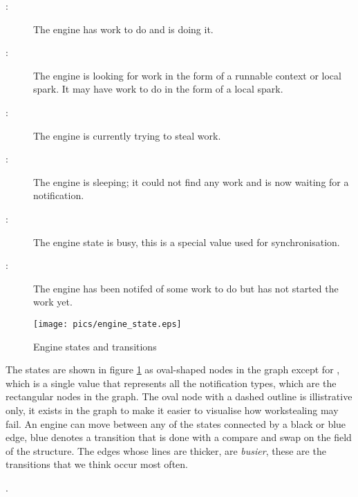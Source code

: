 \begin{description}
    \item[:] The engine has work to do and is doing it.

    \item[:] The engine is looking for work in
        the form of a runnable context or local spark.  It may have work to
        do in the form of a local spark.

    \item[:] The engine is currently trying to steal work.

    \item[:] The engine is sleeping; it could not find any
        work and is now waiting for a notification.

    \item[:] The engine state is busy, this is a special value
        used for synchronisation.

    \item[:] The engine has been notifed of some work to
        do but has not started the work yet.
\end{description}

\begin{figure}
\begin{center}
\texttt{[image: pics/engine\_state.eps]}
\end{center}
\caption{Engine states and transitions}
\label{fig:engine_states}
\end{figure}

\noindent
The states are shown in figure \ref{fig:engine_states} as oval-shaped nodes
in the graph except for ,
which is a single value that represents all the notification types,
which are the rectangular nodes in the graph.
The oval node with a dashed outline is illistrative only,
it exists in the graph to make it easier to visualise how workstealing may
fail.
An engine can move between any of the states connected by a black or blue
edge,
blue denotes a transition that is done with a compare and swap on the
 field of the \enginesleepsync structure.
The edges whose lines are thicker, are \emph{busier},
these are the transitions that we think occur most often.

.



